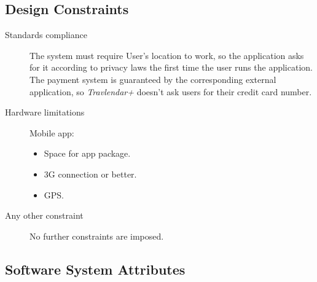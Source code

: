 		
\subsection{Design Constraints}
		\begin{description}
			\item[Standards compliance]
				The system must require User’s location to work, so the application asks for it according to privacy laws the first time the user runs the application. The payment system is guaranteed by the corresponding external application, so \textit{Travlendar+} doesn’t ask users for their credit card number.

			\item[Hardware limitations]
				Mobile app:
				\begin{itemize}
					\item Space for app package.
					\item 3G connection or better.
					\item GPS.
				\end{itemize}

			\item[Any other constraint]
				No further constraints are imposed.
\end{description}
		
\subsection{Software System Attributes}
	

